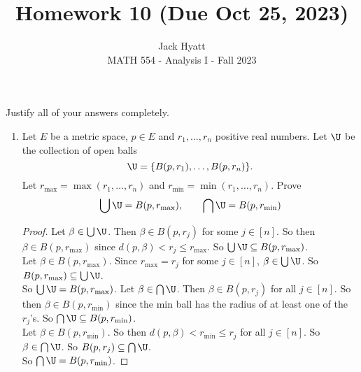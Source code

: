 \documentclass[14pt]{extarticle}
\begin{document}
	
	
	
	\title{Homework 10 (Due Oct 25, 2023)}
	\author{Jack Hyatt\\ %
		MATH 554 - Analysis I - Fall 2023} 
	
	\maketitle
	
	Justify all of your answers completely.\\
	
	
	\medskip 
	
	\begin{enumerate}
		\item Let $E$ be a metric space, $p \in E$ and $r_1,\ldots,r_n$ positive real numbers. Let $\U$ be the collection of open balls
		\[\U = \{B(p,r_1),\ldots,B(p,r_n)\}.\]
		Let $r_{\max} = \max(r_1,\ldots,r_n)$ and $r_{\min} = \min(r_1,\ldots,r_n)$. Prove 
		\[\bigcup\U = B(p,r_{\max}),\qquad \bigcap\U = B(p,r_{\min})\]
		\begin{proof}
			Let $\beta \in \bigcup\U$. Then $\beta \in B(p,r_j)$ for some $j\in[n]$. So then $\beta \in B(p,r_{\max})$ since $d(p,\beta) < r_j \leq r_{\max}$. So $\bigcup\U \subseteq B(p,r_{\max})$.\\
			Let $\beta \in B(p,r_{\max})$. Since $r_{\max} = r_j$ for some $j\in[n]$, $\beta \in \bigcup\U$. So $B(p,r_{\max}) \subseteq \bigcup\U$.\\
			So $\bigcup\U = B(p,r_{\max})$.\m
			Let $\beta \in \bigcap\U$. Then $\beta \in B(p,r_j)$ for all $j\in[n]$. So then $\beta \in B(p,r_{\min})$ since the min ball has the radius of at least one of the $r_j$'s. So $\bigcap\U \subseteq B(p,r_{\min})$.\\
			Let $\beta \in B(p,r_{\min})$. So then $d(p,\beta) < r_{\min} \leq r_j$ for all $j\in[n]$. So $\beta \in \bigcap\U$. So $B(p,r_j) \subseteq \bigcap\U$.\\
			So $\bigcap\U = B(p,r_{\min})$.\m
		\end{proof}
		

\end{enumerate}
\end{document}
